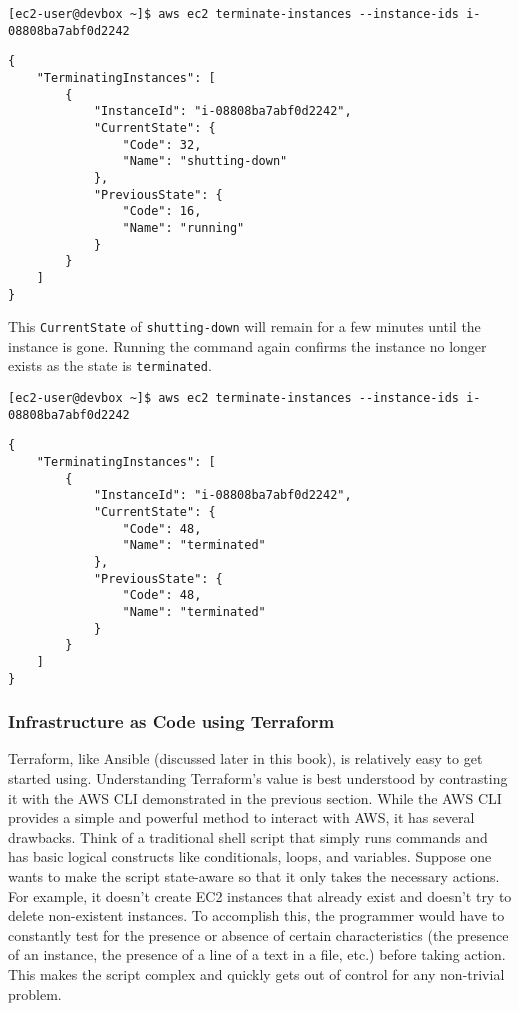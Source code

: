\begin{verbatim}
[ec2-user@devbox ~]$ aws ec2 terminate-instances --instance-ids i-08808ba7abf0d2242
\end{verbatim}

\begin{verbatim}
{
    "TerminatingInstances": [
        {
            "InstanceId": "i-08808ba7abf0d2242", 
            "CurrentState": {
                "Code": 32, 
                "Name": "shutting-down"
            }, 
            "PreviousState": {
                "Code": 16, 
                "Name": "running"
            }
        }
    ]
}
\end{verbatim}

This \verb|CurrentState| of \verb|shutting-down| will remain for a few minutes
until the instance is gone. Running the command again confirms the instance no
longer exists as the state is \verb|terminated|.

\begin{verbatim}
[ec2-user@devbox ~]$ aws ec2 terminate-instances --instance-ids i-08808ba7abf0d2242
\end{verbatim}

\begin{verbatim}
{
    "TerminatingInstances": [
        {
            "InstanceId": "i-08808ba7abf0d2242", 
            "CurrentState": {
                "Code": 48, 
                "Name": "terminated"
            }, 
            "PreviousState": {
                "Code": 48, 
                "Name": "terminated"
            }
        }
    ]
}
\end{verbatim}

\subsubsection{Infrastructure as Code using Terraform}
Terraform, like Ansible (discussed later in this book), is relatively easy to
get started using. Understanding Terraform's value is best understood by
contrasting it with the AWS CLI demonstrated in the previous section. While
the AWS CLI provides a simple and powerful method to interact with AWS, it has
several drawbacks. Think of a traditional shell script that simply runs
commands and has basic logical constructs like conditionals, loops, and
variables. Suppose one wants to make the script state-aware so that it only
takes the necessary actions. For example, it doesn't create EC2 instances that
already exist and doesn't try to delete non-existent instances. To accomplish
this, the programmer would have to constantly test for the presence or absence
of certain characteristics (the presence of an instance, the presence of a
line of a text in a file, etc.) before taking action. This makes the script
complex and quickly gets out of control for any non-trivial problem.

